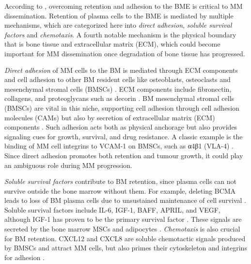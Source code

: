 %
\label{sec:intro_myeloma_retention}%
According to \citet{zeissigTumourDisseminationMultiple2020}, overcoming
retention and adhesion to the BME is critical to MM dissemination. Retention of
plasma cells to the BME is mediated by multiple mechanisms, which are
categorized here into \emph{direct adhesion}, \emph{soluble survival factors}
and \emph{chemotaxis}. A fourth notable mechanism is the physical boundary that
is bone tissue and extracellular matrix (ECM), which could become important for
MM dissemination once degradation of bone tissue has progressed.

\emph{Direct adhesion} of MM cells to the BM is mediated through ECM components
and cell adhesion to other BM resident cells like osteoblasts, osteoclasts and
mesenchymal stromal cells (BMSCs) \cite{bouzerdanAdhesionMoleculesMultiple2022}.
ECM components include fibronectin, collagens, and proteoglycans such as decorin
\cite{huDecorinmediatedSuppressionTumorigenesis2021,
    huangHigherDecorinLevels2015,katzAdhesionMoleculesLifelines2010,
    kiblerAdhesiveInteractionsHuman1998}. BM mesenchymal stromal cells (BMSCs) are
vital in this niche, supporting cell adhesion through cell adhesion molecules
(CAMs) but also by secretion of extracellular matrix (ECM) components
\cite{katzAdhesionMoleculesLifelines2010}. Such adhesion acts both as physical
anchorage but also provides signaling cues for growth, survival, and drug
resistance. A classic example is the binding of MM cell integrins to VCAM-1 on
BMSCs, such as α4β1 (VLA-4) \cite{bouzerdanAdhesionMoleculesMultiple2022}.
Since direct adhesion promotes both retention and tumour growth, it could play
an ambiguous role during MM progression.

\emph{Soluble survival factors} contribute to BM retention, since plasma cells
can not survive outside the bone marrow without them. For example, deleting BCMA
 leads to loss of BM plasma
cells due to unsustained maintenance of cell survival
\cite{oconnorBCMAEssentialSurvival2004}. Soluble survival factors include IL-6,
IGF-1, BAFF, APRIL, and VEGF, although IGF-1 has proven to be the primary
survival factor \cite{sprynskiRoleIGF1Major2009}. These signals are secreted by
the bone marrow MSCs and adipocytes \cite{kiblerAdhesiveInteractionsHuman1998,
garcia-ortizRoleTumorMicroenvironment2021}. \emph{Chemotaxis} is also crucial
for BM retention. CXCL12 and CXCL8 are soluble chemotactic signals produced by
BMSCs and attract MM cells, but also primes their cytoskeleton and integrins for
adhesion \cite{aggarwalChemokinesMultipleMyeloma2006,
alsayedMechanismsRegulationCXCR42007}.

